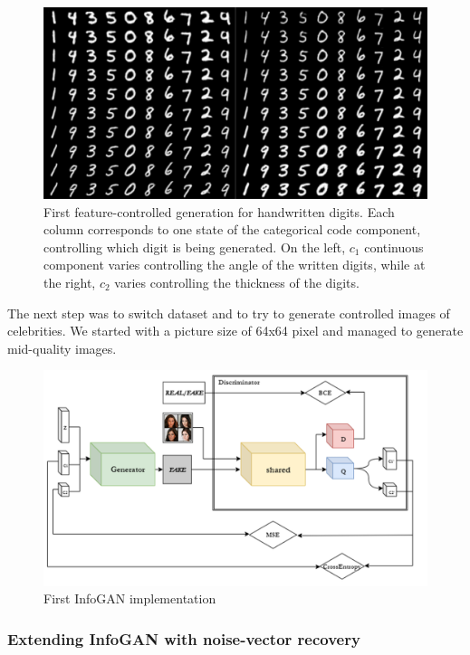 \documentclass[10pt,journal,compsoc]{IEEEtran}
\begin{document}
\begin{figure}[h!]
	\centering
	\includegraphics[width=1\linewidth]{pic/mnist}
	\caption{First feature-controlled generation for handwritten digits. Each column corresponds to one state of the categorical code component, controlling which digit is being generated. On the left, $c_1$ continuous component varies controlling the angle of the written digits, while at the right, $c_2$ varies controlling the thickness of the digits.}
	\label{fig:mnist_results}
\end{figure}

The next step was to switch dataset and to try to generate controlled images of celebrities. We started with a picture size of 64x64 pixel and managed to generate mid-quality images.

\begin{figure}[h]
	\centering
	\includegraphics[width=\linewidth]{pic/1}
	\caption{First InfoGAN implementation}
	\label{fig:infogan}
\end{figure}




\subsubsection{Extending InfoGAN with noise-vector recovery}
\end{document}
